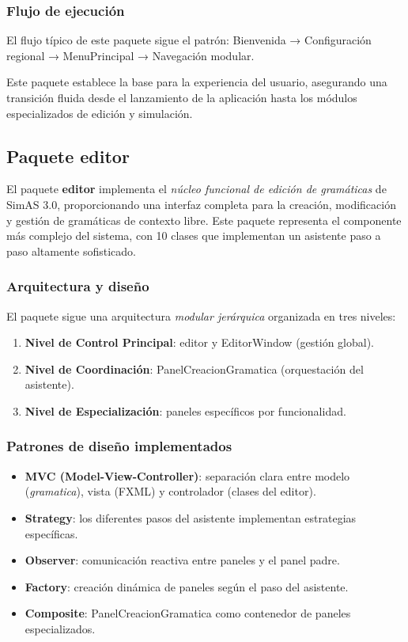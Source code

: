 \subsubsection{Flujo de ejecución}
El flujo típico de este paquete sigue el patrón: Bienvenida → Configuración regional → MenuPrincipal → Navegación modular.

Este paquete establece la base para la experiencia del usuario, asegurando una transición fluida desde el lanzamiento de la aplicación hasta los módulos especializados de edición y simulación.

\subsection{Paquete editor}

El paquete \textbf{editor} implementa el \textit{núcleo funcional de edición de gramáticas} de SimAS 3.0, proporcionando una interfaz completa para la creación, modificación y gestión de gramáticas de contexto libre. Este paquete representa el componente más complejo del sistema, con 10 clases que implementan un asistente paso a paso altamente sofisticado.

\subsubsection{Arquitectura y diseño}

El paquete sigue una arquitectura \textit{modular jerárquica} organizada en tres niveles:

\begin{enumerate}
    \item \textbf{Nivel de Control Principal}: editor y EditorWindow (gestión global).
    \item \textbf{Nivel de Coordinación}: PanelCreacionGramatica (orquestación del asistente).
    \item \textbf{Nivel de Especialización}: paneles específicos por funcionalidad.
\end{enumerate}

\subsubsection{Patrones de diseño implementados}

\begin{itemize}
    \item \textbf{MVC (Model-View-Controller)}: separación clara entre modelo (\textit{gramatica}), vista (FXML) y controlador (clases del editor).
    \item \textbf{Strategy}: los diferentes pasos del asistente implementan estrategias específicas.
    \item \textbf{Observer}: comunicación reactiva entre paneles y el panel padre.
    \item \textbf{Factory}: creación dinámica de paneles según el paso del asistente.
    \item \textbf{Composite}: PanelCreacionGramatica como contenedor de paneles especializados.
\end{itemize}

